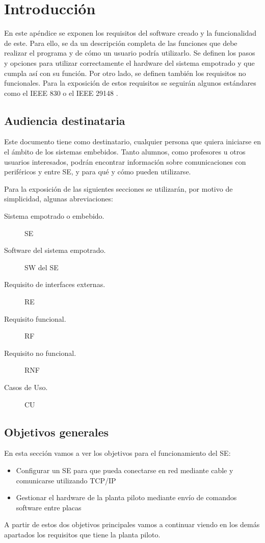  \label{Ap:requisitos}

\section{Introducción}

En este apéndice se exponen los requisitos del software creado y la funcionalidad de este. Para ello, se da un descripción completa de las funciones que debe realizar el programa y de cómo un usuario podría utilizarlo. Se definen los pasos y opciones para utilizar correctamente el hardware del sistema empotrado y que cumpla así con su función. Por otro lado, se definen también los requisitos no funcionales. Para la exposición de estos requisitos se seguirán algunos estándares como el IEEE 830 \cite{IEEE8301998} o el IEEE 29148 \cite{IEEE291482011}.

\subsection{Audiencia destinataria}
Este documento tiene como destinatario, cualquier persona que quiera iniciarse en el ámbito de los sistemas embebidos. Tanto alumnos, como profesores u otros usuarios interesados, podrán encontrar información sobre comunicaciones con periféricos y entre SE, y para qué y cómo pueden utilizarse. 

Para la exposición de las siguientes secciones se utilizarán, por motivo de simplicidad, algunas abreviaciones:
\begin{description}
\item[Sistema empotrado o embebido.] SE
\item[Software del sistema empotrado.] SW del SE
\item[Requisito de interfaces externas.] RE
\item[Requisito funcional.] RF
\item[Requisito no funcional.] RNF
\item[Casos de Uso.] CU
\end{description}

\subsection{Objetivos generales}
En esta sección vamos a ver los objetivos para el funcionamiento del SE:
\begin{itemize}
\item Configurar un SE para que pueda conectarse en red mediante cable y comunicarse utilizando TCP/IP 
\item Gestionar el hardware de la planta piloto mediante envío de comandos software entre placas
\end{itemize}
A partir de estos dos objetivos principales vamos a continuar viendo en los demás apartados los requisitos que tiene la planta piloto.


